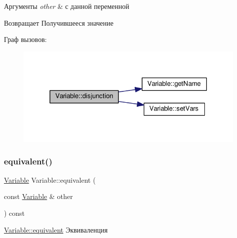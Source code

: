 \begin{DoxyParams}{Аргументы}
{\em other} & с данной переменной \\
\hline
\end{DoxyParams}
\begin{DoxyReturn}{Возвращает}
Получившееся значение 
\end{DoxyReturn}
Граф вызовов\+:\nopagebreak
\begin{figure}[H]
\begin{center}
\leavevmode
\includegraphics[width=318pt]{class_variable_a2e4849eea01ce6e2ec9ba143164e7d57_cgraph}
\end{center}
\end{figure}
\mbox{\label{class_variable_a104b427ab0f43e9eb24f049ec6b524b0}} 
\subsubsection{\texorpdfstring{equivalent()}{equivalent()}}
{\footnotesize\ttfamily \hyperlink{class_variable}{Variable} Variable\+::equivalent (\begin{DoxyParamCaption}\item[{const \hyperlink{class_variable}{Variable} \&}]{other }\end{DoxyParamCaption}) const}



\hyperlink{class_variable_a104b427ab0f43e9eb24f049ec6b524b0}{Variable\+::equivalent} Эквиваленция 


